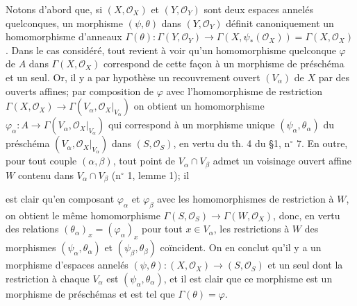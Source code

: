 Notons d'abord que, si $(X, \mathcal{O}_X)$ et $(Y, \mathcal{O}_Y)$ sont deux espaces annelés quelconques, un morphisme $(\psi, \theta)$ dans $(Y, \mathcal{O}_Y)$ définit canoniquement un homomorphisme d'anneaux $\Gamma(\theta): \Gamma(Y, \mathcal{O}_Y) \to \Gamma(X, \psi_*(\mathcal{O}_X)) = \Gamma(X, \mathcal{O}_X)$. Dans le cas considéré, tout revient à voir qu'un homomorphisme quelconque $\varphi$ de $A$ dans $\Gamma(X, \mathcal{O}_X)$ correspond de cette façon à un morphisme de préschéma et un seul. Or, il y a par hypothèse un recouvrement ouvert $(V_\alpha)$ de $X$ par des ouverts affines; par composition de $\varphi$ avec l'homomorphisme de restriction $\Gamma(X, \mathcal{O}_X) \to \Gamma(V_\alpha, \mathcal{O}_X|_{V_\alpha})$ on obtient un homomorphisme $\varphi_\alpha: A \to \Gamma(V_\alpha, \mathcal{O}_X|_{V_\alpha})$ qui correspond à un morphisme unique $(\psi_\alpha, \theta_\alpha)$ du préschéma $(V_\alpha, \mathcal{O}_X|_{V_\alpha})$ dans $(S, \mathcal{O}_S)$, en vertu du th. 4 du \S 1, n$^\circ$ 7. En outre, pour tout couple $(\alpha, \beta)$, tout point de $V_\alpha \cap V_\beta$ admet un voisinage ouvert affine $W$ contenu dans $V_\alpha \cap V_\beta$ (n$^\circ$ 1, lemme 1); il

\newpage


est clair qu'en composant $\varphi_\alpha$ et $\varphi_\beta$ avec les homomorphismes de restriction à $W$, on obtient le même homomorphisme $\Gamma(S, \mathcal{O}_S) \to \Gamma(W, \mathcal{O}_X)$, donc, en vertu des relations $(\theta_\alpha)_x = (\varphi_\alpha)_x$ pour tout $x \in V_\alpha$, les restrictions à $W$ des morphismes $(\psi_\alpha, \theta_\alpha)$ et $(\psi_\beta, \theta_\beta)$ coïncident. On en conclut qu'il y a un morphisme d'espaces annelés $(\psi, \theta) : (X, \mathcal{O}_X) \to (S, \mathcal{O}_S)$ et un seul dont la restriction à chaque $V_\alpha$ est $(\psi_\alpha, \theta_\alpha)$, et il est clair que ce morphisme est un morphisme de préschémas et est tel que $\Gamma(\theta) = \varphi$.

